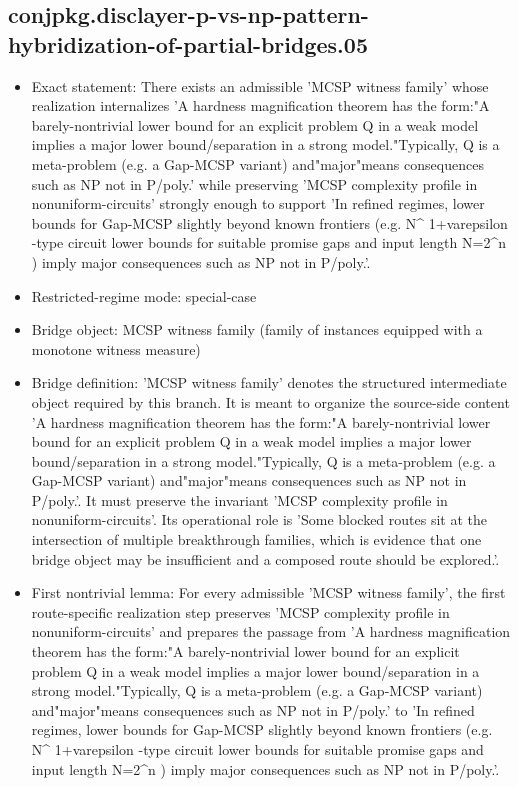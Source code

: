 \documentclass[11pt]{article}
\begin{document}
\subsection*{conjpkg.disclayer-p-vs-np-pattern-hybridization-of-partial-bridges.05}
\begin{itemize}
\item Exact statement: There exists an admissible 'MCSP witness family' whose realization internalizes 'A hardness magnification theorem has the form:"A barely-nontrivial lower bound for an explicit problem Q in a weak model implies a major lower bound/separation in a strong model."Typically, Q is a meta-problem (e.g. a Gap-MCSP variant) and"major"means consequences such as NP not in P/poly.' while preserving 'MCSP complexity profile in nonuniform-circuits' strongly enough to support 'In refined regimes, lower bounds for Gap-MCSP slightly beyond known frontiers (e.g. N\textasciicircum{} 1+varepsilon -type circuit lower bounds for suitable promise gaps and input length N=2\textasciicircum{}n ) imply major consequences such as NP not in P/poly.'.
\item Restricted-regime mode: special-case
\item Bridge object: MCSP witness family (family of instances equipped with a monotone witness measure)
\item Bridge definition: 'MCSP witness family' denotes the structured intermediate object required by this branch. It is meant to organize the source-side content 'A hardness magnification theorem has the form:"A barely-nontrivial lower bound for an explicit problem Q in a weak model implies a major lower bound/separation in a strong model."Typically, Q is a meta-problem (e.g. a Gap-MCSP variant) and"major"means consequences such as NP not in P/poly.'. It must preserve the invariant 'MCSP complexity profile in nonuniform-circuits'. Its operational role is 'Some blocked routes sit at the intersection of multiple breakthrough families, which is evidence that one bridge object may be insufficient and a composed route should be explored.'.
\item First nontrivial lemma: For every admissible 'MCSP witness family', the first route-specific realization step preserves 'MCSP complexity profile in nonuniform-circuits' and prepares the passage from 'A hardness magnification theorem has the form:"A barely-nontrivial lower bound for an explicit problem Q in a weak model implies a major lower bound/separation in a strong model."Typically, Q is a meta-problem (e.g. a Gap-MCSP variant) and"major"means consequences such as NP not in P/poly.' to 'In refined regimes, lower bounds for Gap-MCSP slightly beyond known frontiers (e.g. N\textasciicircum{} 1+varepsilon -type circuit lower bounds for suitable promise gaps and input length N=2\textasciicircum{}n ) imply major consequences such as NP not in P/poly.'.

\end{itemize}
\end{document}
